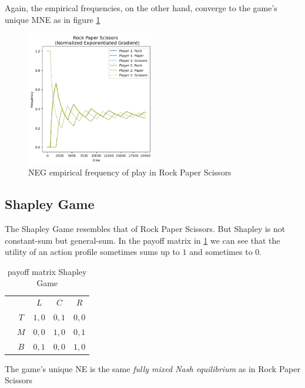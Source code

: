 Again, the empirical frequencies, on the other hand, converge to the game's unique MNE as in figure \ref{fig:RPS3}

\begin{figure}[H]
    \centering
    \includegraphics[width=0.5\textwidth]{logos/RPS3.png}
    \caption{NEG empirical frequency of play in Rock Paper Scissors}
    \label{fig:RPS3}
\end{figure}


\subsection{Shapley Game}\label{subsection:shapleyGame}

The Shapley Game resembles that of Rock Paper Scissors. But Shapley is not constant-sum but general-sum. In the payoff matrix in \ref{tab:payoffShapley} we can see that the utility of an action profile sometimes sums up to $1$ and sometimes to $0$. 

\begin{table}[H]\centering
\setlength{\extrarowheight}{2pt}
\begin{tabular}{cc|c|c|c|}
  & \multicolumn{1}{c}{} & \multicolumn{1}{c}{$L$}  & \multicolumn{1}{c}{$C$}  & \multicolumn{1}{c}{$R$} \\\cline{3-5}
            & $T$ & $1,0$ & $0,1$ & $0,0$ \\ \cline{3-5}
            & $M$ & $0,0$ & $1,0$ & $0,1$ \\\cline{3-5}
            & $B$ & $0,1$ & $0,0$ & $1,0$ \\\cline{3-5}
\end{tabular}\caption{\label{tab:payoffShapley}payoff matrix Shapley Game}
\end{table}

The game's unique NE is the same \textit{fully mixed Nash equilibrium} as in Rock Paper Scissors

